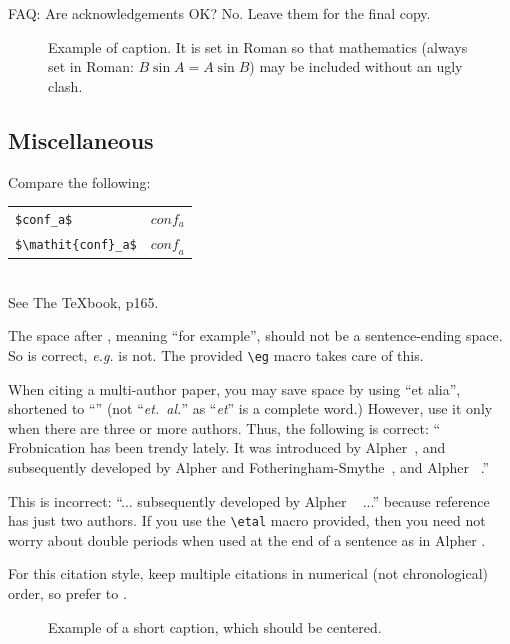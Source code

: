 \documentclass[10pt,twocolumn,letterpaper]{article}
\begin{document}
FAQ: Are acknowledgements OK?  No.  Leave them for the final copy.


\begin{figure}[t]
  \begin{center}
    \fbox{\rule{0pt}{2in} \rule{0.9\linewidth}{0pt}}
  \end{center}
  \caption{Example of caption.  It is set in Roman so that mathematics
    (always set in Roman: $B \sin A = A \sin B$) may be included
    without an ugly clash.}
  \label{fig:long}
  \label{fig:onecol}
\end{figure}

\subsection{Miscellaneous}

\noindent
Compare the following:\\
\begin{tabular}{ll}
  \verb'$conf_a$' &  $conf_a$ \\
  \verb'$\mathit{conf}_a$' & $\mathit{conf}_a$
\end{tabular}\\
See The \TeX book, p165.

The space after \eg, meaning ``for example'', should not be a
sentence-ending space. So \eg is correct, {\em e.g.} is not.  The
provided \verb'\eg' macro takes care of this.

When citing a multi-author paper, you may save space by using ``et
alia'', shortened to ``\etal'' (not ``{\em et.\ al.}'' as ``{\em et}''
is a complete word.)  However, use it only when there are three or
more authors.  Thus, the following is correct: `` Frobnication has
been trendy lately.  It was introduced by Alpher~\cite{Alpher02}, and
subsequently developed by Alpher and
Fotheringham-Smythe~\cite{Alpher03}, and Alpher
\etal~\cite{Alpher04}.''

This is incorrect: ``... subsequently developed by Alpher
\etal~\cite{Alpher03} ...''  because reference~\cite{Alpher03} has
just two authors.  If you use the \verb'\etal' macro provided, then
you need not worry about double periods when used at the end of a
sentence as in Alpher \etal.

For this citation style, keep multiple citations in numerical (not
chronological) order, so prefer \cite{Alpher03,Alpher02,Authors12} to
\cite{Alpher02,Alpher03,Authors12}.


\begin{figure}
  \begin{center}
    \fbox{\rule{0pt}{2in} \rule{.9\linewidth}{0pt}}
  \end{center}
  \caption{Example of a short caption, which should be centered.}
  \label{fig:short}
\end{figure}
\end{document}
